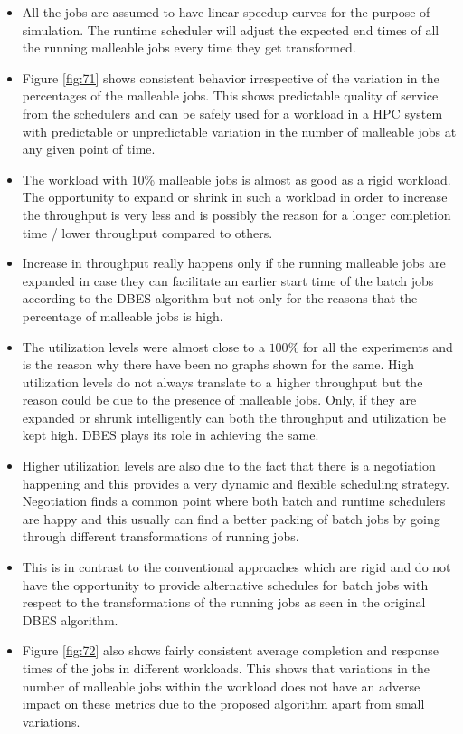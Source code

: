 \begin{itemize}
\item All the jobs are assumed to have linear speedup curves for the purpose of simulation. The runtime scheduler will adjust the expected end times of all the running malleable jobs every time they get transformed.
\item Figure \ref{fig:71} shows consistent behavior irrespective of the variation in the percentages of the malleable jobs. This shows predictable quality of service from the schedulers and can be safely used for a workload in a HPC system with predictable or unpredictable variation in the number of malleable jobs at any given point of time.
\item The workload with $10$\% malleable jobs is almost as good as a rigid workload. The opportunity to expand or shrink in such a workload in order to increase the throughput is very less and is possibly the reason for a longer completion time / lower throughput compared to others.
\item Increase in throughput really happens only if the running malleable jobs are expanded in case they can facilitate an earlier start time of the batch jobs according to the DBES algorithm but not only for the reasons that the percentage of malleable jobs is high.
\item The utilization levels were almost close to a $100\%$ for all the experiments and is the reason why there have been no graphs shown for the same. High utilization levels do not always translate to a higher throughput but the reason could be due to the presence of malleable jobs. Only, if they are expanded or shrunk intelligently can both the throughput and utilization be kept high. DBES plays its role in achieving the same.
\item Higher utilization levels are also due to the fact that there is a negotiation happening and this provides a very dynamic and flexible scheduling strategy. Negotiation finds a common point where both batch and runtime schedulers are happy and this usually can find a better packing of batch jobs by going through different transformations of running jobs. 
\item This is in contrast to the conventional approaches which are rigid and do not have the opportunity to provide alternative schedules for batch jobs with respect to the transformations of the running jobs as seen in the original DBES algorithm.
\item Figure \ref{fig:72} also shows fairly consistent average completion and response times of the jobs in different workloads. This shows that variations in the number of malleable jobs within the workload does not have an adverse impact on these metrics due to the proposed algorithm apart from small variations.
\end{itemize}
